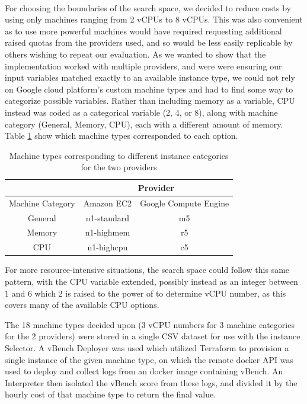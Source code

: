 \documentclass{article}
\begin{document}
\paragraph{}
For choosing the boundaries of the search space, we decided to reduce costs by using only machines ranging from 2 vCPUs to 8 vCPUs. This was also convenient as to use more powerful machines would have required requesting additional raised quotas from the providers used, and so would be less easily replicable by others wishing to repeat our evaluation. As we wanted to show that the implementation worked with multiple providers, and were were ensuring our input variables matched exactly to an available instance type, we could not rely on Google cloud platform's custom machine types and had to find some way to categorize possible variables. Rather than including memory as a variable, CPU instead was coded as a categorical variable (2, 4, or 8), along with machine category (General, Memory, CPU), each with a different amount of memory. Table \ref{tab:instance-types} show which machine types corresponded to each option. 

\begin{table}[!hb]
\centering
\begin{tabular}{ |c||c|c|  }
 \hline
 & \multicolumn{2}{|c|}{Provider} \\
 \hline
 Machine Category & Amazon EC2 & Google Compute Engine \\
 \hline
 General& n1-standard & m5\\
 Memory & n1-highmem  & r5\\
 CPU    & n1-highcpu  & c5\\
 \hline
\end{tabular}
\caption{Machine types corresponding to different instance categories for the two providers}
\label{tab:instance-types}
\end{table}

For more resource-intensive situations, the search space could follow this same pattern, with the CPU variable extended, possibly instead as an integer between 1 and 6 which 2 is raised to the power of to determine vCPU number, as this covers many of the available CPU options.

The 18 machine types decided upon (3 vCPU numbers for 3 machine categories for the 2 providers) were stored in a single CSV dataset for use with the instance Selector. A vBench Deployer was used which utilized Terraform to provision a single instance of the given machine type, on which the remote docker API was used to deploy and collect logs from an docker image containing vBench. An Interpreter then isolated the vBench score from these logs, and divided it by the hourly cost of that machine type to return the final value.
\end{document}

